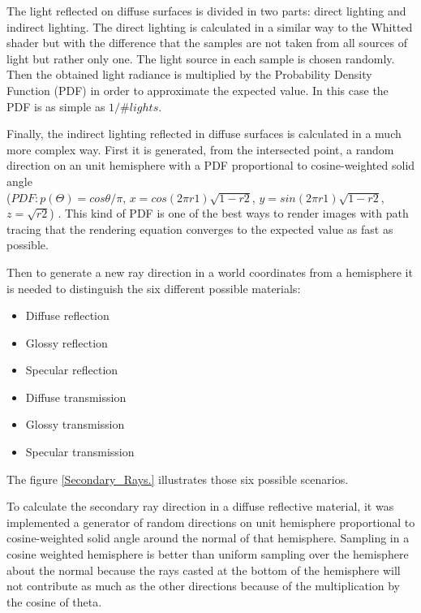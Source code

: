 \par
The light reflected on diffuse surfaces is divided in two parts: direct lighting and indirect lighting.
The direct lighting is calculated in a similar way to the Whitted shader but with the difference that the samples are not taken from all sources of light but rather only one.
The light source in each sample is chosen randomly.
Then the obtained light radiance is multiplied by the Probability Density Function (PDF) in order to approximate the expected value.
In this case the PDF is as simple as
$1 / \#lights$.

\par
Finally, the indirect lighting reflected in diffuse surfaces is calculated in a much more complex way.
First it is generated, from the intersected point, a random direction on an unit hemisphere with a PDF proportional to cosine-weighted solid angle\\
($PDF: p(\Theta) = cos\theta / \pi$,
$x = cos(2\pi r1)\sqrt{1-r2}$,
$y = sin(2\pi r1)\sqrt{1-r2}$,
$z = \sqrt{r2}$)
.
This kind of PDF is one of the best ways to render images with path tracing that the rendering equation converges to the expected value as fast as possible.

Then to generate a new ray direction in a world coordinates from a hemisphere it is needed to distinguish the six different possible materials:

\begin{itemize}
	\item Diffuse reflection
	\item Glossy reflection
	\item Specular reflection
	\item Diffuse transmission
	\item Glossy transmission
	\item Specular transmission
\end{itemize}

\par
The figure \ref{Secondary_Rays.} illustrates those six possible scenarios.

To calculate the secondary ray direction in a diffuse reflective material, it was implemented a generator of random directions on unit hemisphere proportional to cosine-weighted solid angle around the normal of that hemisphere.
Sampling in a cosine weighted hemisphere is better than uniform sampling over the hemisphere about the normal because the rays casted at the bottom of the hemisphere will not contribute as much as the other directions because of the multiplication by the cosine of theta.


